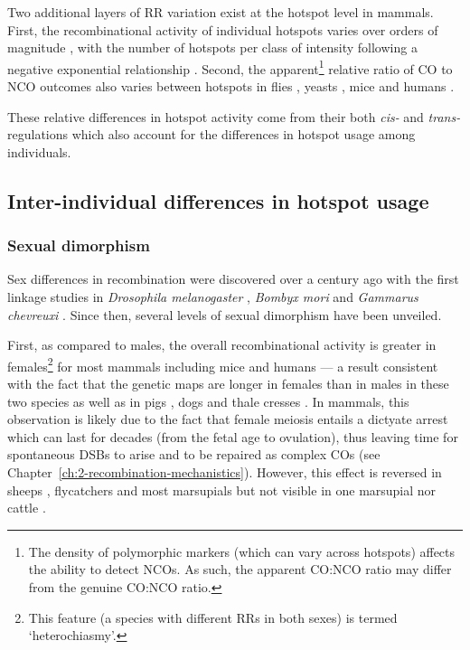 Two additional layers of RR variation exist at the hotspot level in mammals.
First, the recombinational activity of individual hotspots varies over orders of magnitude \citep{jeffreys2001intensely,kauppi2004where,paigen2008recombinational}, with the number of hotspots per class of intensity following a negative exponential relationship \citep{paigen2010mammalian}.
Second, the apparent\footnote{The density of polymorphic markers (which can vary across hotspots) affects the ability to detect NCOs. As such, the apparent CO:NCO ratio may differ from the genuine CO:NCO ratio.} relative ratio of CO to NCO outcomes also varies between hotspots in flies \citep{singh2012classical}, yeasts \citep{mancera2008highresolution}, mice \citep{paigen2008recombinational} and humans \citep{jeffreys2004intense}.

These relative differences in hotspot activity come from their both \textit{cis-} and \textit{trans-} regulations \citep[reviewed in][]{paigen2010mammalian} which also account for the differences in hotspot usage among individuals.



\subsection{Inter-individual differences in hotspot usage}

\subsubsection{Sexual dimorphism}

Sex differences in recombination were discovered over a century ago with the first linkage studies in \textit{Drosophila melanogaster} \citep{morgan1912complete,morgan1914no}, \textit{Bombyx mori} \citep{takanaytianzhong1914sexualWITHJAP} and \textit{Gammarus chevreuxi} \citep{huxley1928sexual}. 
Since then, several levels of sexual dimorphism have been unveiled.

First, as compared to males, the overall recombinational activity is greater in females\footnote{This feature (a species with different RRs in both sexes) is termed ‘heterochiasmy’.} for most mammals \citep{dunn1967sex} including mice \citep{shifman2006highresolution} and humans \citep{donis-keller1987genetic,broman1998comprehensive} — a result consistent with the fact that the genetic maps are longer in females than in males in these two species \citep{lynn2004variation,cox2009new} as well as in pigs \citep{mikawa1999linkage}, dogs \citep{neff1999secondgeneration} and thale cresses \citep{drouaud2007sexspecific}. 
In mammals, this observation is likely due to the fact that female meiosis entails a dictyate arrest which can last for decades (from the fetal age to ovulation), thus leaving time for spontaneous DSBs to arise and to be repaired as complex COs (see Chapter~\ref{ch:2-recombination-mechanistics}).
However, this effect is reversed in sheeps \citep{maddox2001enhanced}, flycatchers \citep{backstrom2008genebased} and most marsupials \citep{bennett1986novel,hayman1988further,hayman1990meiosis} but not visible in one marsupial \citep{hayman1990comparative} nor cattle \citep{kappes1997secondgeneration}.

